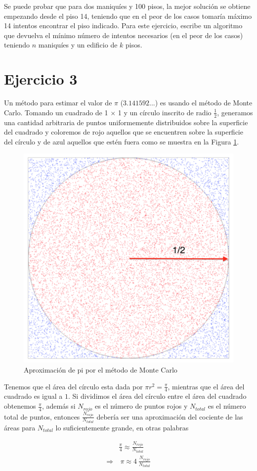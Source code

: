 \documentclass[a4paper]{article}
\begin{document}
Se puede probar que para dos maniquíes y 100 pisos, la mejor solución se obtiene empezando desde el piso 14, teniendo que en el peor de los casos tomaría máximo 14 intentos encontrar el piso indicado. Para este ejercicio, escribe un algoritmo que devuelva el mínimo número de intentos necesarios (en el peor de los casos) teniendo $n$ maniquíes y un edificio de $k$ pisos.


\section*{Ejercicio 3} \label{Sec: Ejercicio 3}

Un método para estimar el valor de $\pi$ ($3.141592...$) es usando el método de Monte Carlo. Tomando un cuadrado de 1 $\times$ 1 y un círculo inscrito de radio $\frac{1}{2}$, generamos una cantidad arbitraria de puntos uniformemente distribuidos sobre la superficie del cuadrado y coloremos de rojo aquellos que se encuentren sobre la superficie del círculo y de azul aquellos que estén fuera como se muestra en la Figura \ref{fig:pi}.

\begin{figure}[h!]
    \centering
    \includegraphics[width=.4\linewidth]{img/pi.png}
    \caption{Aproximación de pi por el método de Monte Carlo}
    \label{fig:pi}
\end{figure}

Tenemos que el área del círculo esta dada por $\pi r^2 = \frac{\pi}{4}$, mientras que el área del cuadrado es igual a $1$. Si dividimos el área del círculo entre el área del cuadrado obtenemos $\frac{\pi}{4}$, además si $N_{rojo}$ es el número de puntos rojos y $N_{total}$ es el número total de puntos, entonces $\frac{N_{rojo}}{N_{total}}$ debería ser una aproximación del cociente de las áreas para $N_{total}$ lo suficientemente grande, en otras palabras

\begin{align*}
    & \frac{\pi}{4} \approx \frac{N_{rojo}}{N_{total}} \\
    \Rightarrow & \ \pi \approx 4\ \frac{N_{rojo}}{N_{total}}
\end{align*}
\end{document}
